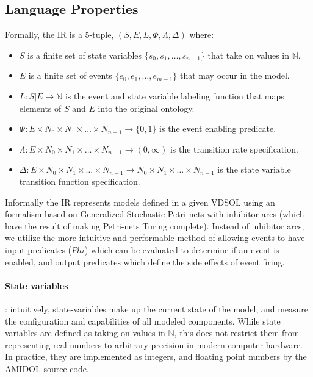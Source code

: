 \documentclass[11pt]{article}
\newcommand{\amidol}{\textsc{AMIDOL}}
\begin{document}
\subsection{Language Properties}

Formally, the IR is a 5-tuple, $(S, E, L, \Phi, \Lambda, \Delta)$ where:
\begin{itemize}
\item $S$ is a finite set of state variables $\{s_0, s_1, \ldots, s_{n-1}\}$ that take on values in $\mathbb{N}$.
\item $E$ is a finite set of events $\{e_0, e_1, \ldots, e_{m-1}\}$ that may occur in the model.
\item $L: S|E \rightarrow \mathbb{N}$ is the event and state variable labeling function that maps elements of $S$ and $E$ into the original ontology.
\item $\Phi: E \times N_0 \times N_1 \times \ldots \times N_{n-1} \rightarrow \{0, 1\}$ is the event enabling predicate.
\item $\Lambda: E \times N_0 \times N_1 \times \ldots \times N_{n-1} \rightarrow (0, \infty)$ is the transition rate specification.
\item $\Delta: E \times N_0 \times N_1 \times \ldots \times N_{n-1} \rightarrow N_0 \times N_1 \times \ldots \times N_{n-1}$ is the state variable transition function specification.
\end{itemize}

Informally the IR represents models defined in a given VDSOL using an formalism based on Generalized Stochastic Petri-nets with inhibitor arcs (which have the result of making Petri-nets Turing complete).  Instead of inhibitor arcs, we utilize the more intuitive and performable method of allowing events to have input predicates ($Phi$) which can be evaluated to determine if an event is enabled, and output predicates which define the side effects of event firing.

\paragraph{State variables}: intuitively, state-variables make up the current state of the model, and measure the configuration and capabilities of all modeled components.  While state variables are defined as taking on values in $\mathbb{N}$, this does not restrict them from representing real numbers to arbitrary precision in modern computer hardware.  In practice, they are implemented as integers, and floating point numbers by the \amidol{} source code.
\end{document}
